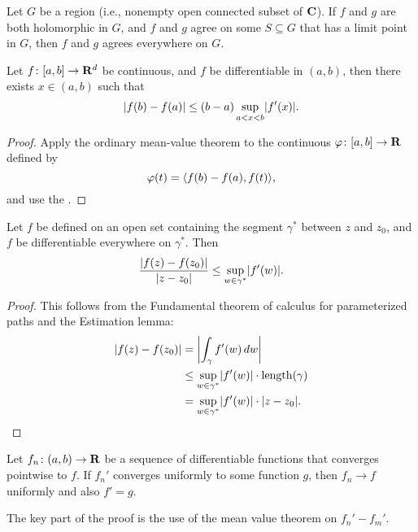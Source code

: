 \begin{namedthm} \label{thm:uniqueness-cplx}
    Let $G$ be a region (i.e., nonempty open connected subset of $\mathbf{C}$). If $f$ and $g$ are both holomorphic in $G$, and $f$ and $g$ agree on some $S \subseteq G$ that has a limit point in $G$, then $f$ and $g$ agrees everywhere on $G$.
\end{namedthm}

\begin{namedthm}
    Let $f\colon [a,b] \to \mathbf{R}^d$ be continuous, and $f$ be differentiable in $(a,b)$, then there exists $x \in (a,b)$ such that \[
        \lvert f(b) - f(a) \rvert \leq (b-a) \sup_{a< x < b} \lvert f'(x) \rvert.
    \]
\end{namedthm}
\begin{proof}
    Apply the ordinary mean-value theorem to the continuous $\varphi\colon [a,b] \to \mathbf{R}$ defined by \[
        \varphi(t) = \langle f(b) - f(a), f(t) \rangle,
    \] and use the .
\end{proof}

\begin{namedthm}
    Let $f$ be defined on an open set containing the segment $\gamma^*$ between $z$ and $z_0$, and $f$ be differentiable everywhere on $\gamma^*$. Then \[
        \frac{\lvert f(z) - f(z_0) \rvert}{\lvert z - z_0 \rvert} \leq \sup_{w\in \gamma^*}\lvert f'(w) \rvert.
    \]
\end{namedthm}
\begin{proof}
    This follows from the Fundamental theorem of calculus for parameterized paths and the Estimation lemma: \begin{align*}
         \lvert f(z) - f(z_0) \rvert & = \biggl\vert \int_\gamma f'(w)\,dw\biggr\vert \\ & \leq \sup_{w\in \gamma^*} \lvert f'(w) \rvert\cdot \operatorname{length}(\gamma) \\ & = \sup_{w\in \gamma^*} \lvert f'(w) \rvert\cdot \lvert z - z_0 \rvert. \qedhere
    \end{align*}
\end{proof}

\begin{namedthm}
    Let $f_n \colon (a,b)\to \mathbf{R}$ be a sequence of differentiable functions that converges pointwise to $f$. If $f_n'$ converges uniformly to some function $g$, then $f_n\to f$ uniformly and also $f' = g$.
\end{namedthm}
The key part of the proof is the use of the mean value theorem on $f_n' - f_m'$. 


